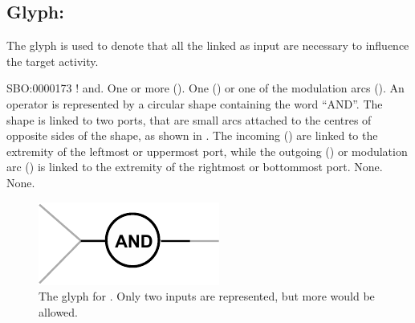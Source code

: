 \subsection{Glyph: }
\label{sec:af:and}

The glyph  is used to denote that all the  linked as input are necessary to influence the target activity.

\begin{glyphDescription}
 \glyphSboTerm SBO:0000173 ! and.
 \glyphIncoming One or more  ().
 \glyphOutgoing  One  () or one of the modulation arcs ().
 \glyphContainer An  operator is represented by a circular shape containing the word ``AND''.
The shape is linked to two ports, that are small arcs attached to the centres of opposite sides of the shape, as shown in .
The incoming  () are linked to the extremity of the leftmost or uppermost port, while the outgoing  () or modulation arc () is linked to the extremity of the rightmost or bottommost port.
 \glyphLabel None.
 \glyphAux None.
\end{glyphDescription}

\begin{figure}[H]
  \centering
  \includegraphics[scale = 1]{images/build/and.pdf}
  \caption{The \AF glyph for . Only two inputs are represented, but more would be allowed.}
  \label{fig:af:and}
\end{figure}
